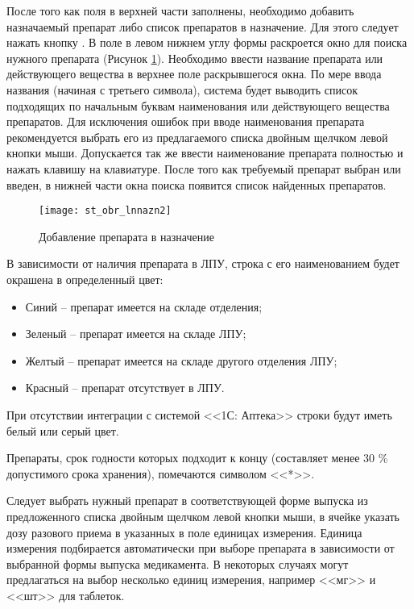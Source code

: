 После того как поля в верхней части заполнены, необходимо добавить назначаемый препарат либо список препаратов в назначение. Для этого следует нажать кнопку . В поле  в левом нижнем углу формы раскроется окно для поиска нужного препарата (Рисунок \ref{img_st_obr_lnnazn2}). Необходимо ввести название препарата или действующего вещества в верхнее поле раскрывшегося окна. По мере ввода названия (начиная с третьего символа), система будет выводить список подходящих по начальным буквам наименования или действующего вещества препаратов. Для исключения ошибок при вводе наименования препарата рекомендуется выбрать его из предлагаемого списка двойным щелчком левой кнопки мыши. Допускается так же ввести наименование препарата полностью и нажать клавишу  на клавиатуре. После того как требуемый препарат выбран или введен, в нижней части окна поиска появится список найденных препаратов.

\begin{figure}[ht]\centering
   \texttt{[image: st\_obr\_lnnazn2]}
   \caption{Добавление препарата в назначение}
   \label{img_st_obr_lnnazn2}
\end{figure} 

В зависимости от наличия препарата в ЛПУ, строка с его наименованием будет окрашена в определенный цвет:
\begin{itemize}
 \item 	Синий – препарат имеется на складе отделения;
 \item Зеленый – препарат имеется на складе ЛПУ;
 \item Желтый – препарат имеется на складе другого отделения ЛПУ;
 \item Красный – препарат отсутствует в ЛПУ.
\end{itemize}
 
\begin{prim}
 При отсутствии интеграции с системой <<1С: Аптека>> строки будут иметь белый или серый цвет.
\end{prim}

Препараты, срок годности которых подходит к концу (составляет менее 30 \% допустимого срока хранения), помечаются символом <<*>>.

Следует выбрать нужный препарат в соответствующей форме выпуска из предложенного списка двойным щелчком левой кнопки мыши, в ячейке  указать дозу разового приема в указанных в поле  единицах измерения. Единица измерения подбирается автоматически при выборе препарата в зависимости от выбранной формы выпуска медикамента. В некоторых случаях могут предлагаться на выбор несколько единиц измерения, например <<мг>> и <<шт>> для таблеток.

